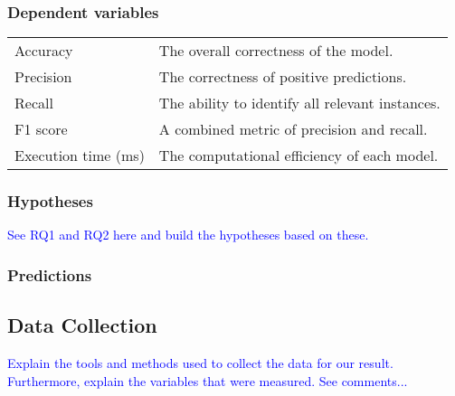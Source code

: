 \subsubsection{Dependent variables}
%
\begin{center}
    \begin{tabular}{| l | l |}
        Accuracy            & The overall correctness of the model.           \\
        Precision           & The correctness of positive predictions.        \\
        Recall              & The ability to identify all relevant instances. \\
        F1 score            & A combined metric of precision and recall.      \\
        Execution time (ms) & The computational efficiency of each model.     \\
    \end{tabular}
\end{center}

\subsubsection{Hypotheses}
\textcolor{blue}{See RQ1 and RQ2 here and build the hypotheses based on these.}

\subsubsection{Predictions}

\subsection{Data Collection}
%
%
\textcolor{blue}{Explain the tools and methods used to collect the data for our
result. Furthermore, explain the variables that were measured. See comments...}

